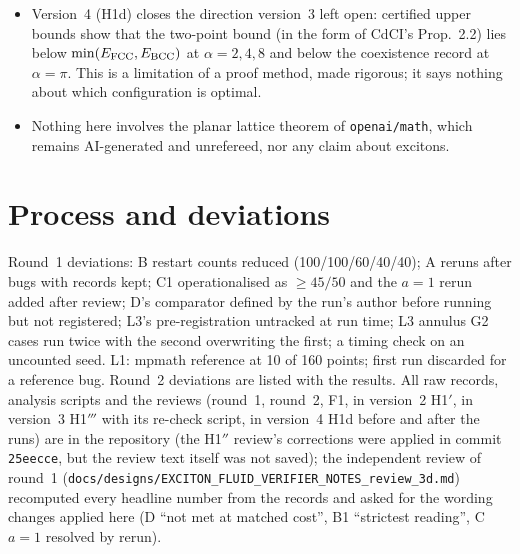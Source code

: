 \documentclass[11pt,a4paper]{article}
\begin{document}
\begin{itemize}[leftmargin=1.2em,itemsep=1pt]
found in review. Nothing here proves or refutes FCC/BCC optimality.
\item Version~4 (H1d) closes the direction version~3 left open: certified upper bounds show that the two-point bound (in the
form of CdCI's Prop.~2.2) lies below $\min(E_{\rm FCC},E_{\rm BCC})$ at $\alpha=2,4,8$ and below the coexistence record at
$\alpha=\pi$. This is a limitation of a proof method, made rigorous; it says nothing about which configuration is optimal.
\item Nothing here involves the planar lattice theorem of \texttt{openai/math}, which remains AI-generated and unrefereed, nor any
claim about excitons.
\end{itemize}

\section{Process and deviations}\label{sec:process}
Round~1 deviations: B restart counts reduced (100/100/60/40/40); A reruns after bugs with records kept; C1 operationalised as
$\ge45/50$ and the $a=1$ rerun added after review; D's comparator defined by the run's author before running but not registered;
L3's pre-registration untracked at run time; L3 annulus G2 cases run twice with the second overwriting the first; a timing check on
an uncounted seed. L1: mpmath reference at 10 of 160 points; first run discarded for a reference bug. Round~2 deviations are listed
with the results. All raw records, analysis scripts and the reviews (round~1, round~2, F1, in version~2 H1$'$, in version~3 H1$'''$ with its re-check script, in version~4 H1d before and after the runs) are in the repository (the H1$''$ review's corrections were applied in commit \texttt{25eecce}, but the review text itself was not saved); the independent review of round~1
(\texttt{docs/designs/EXCITON\_FLUID\_VERIFIER\_NOTES\_review\_3d.md}) recomputed every headline number from the records and asked for
the wording changes applied here (D ``not met at matched cost'', B1 ``strictest reading'', C $a=1$ resolved by rerun).
\end{document}
